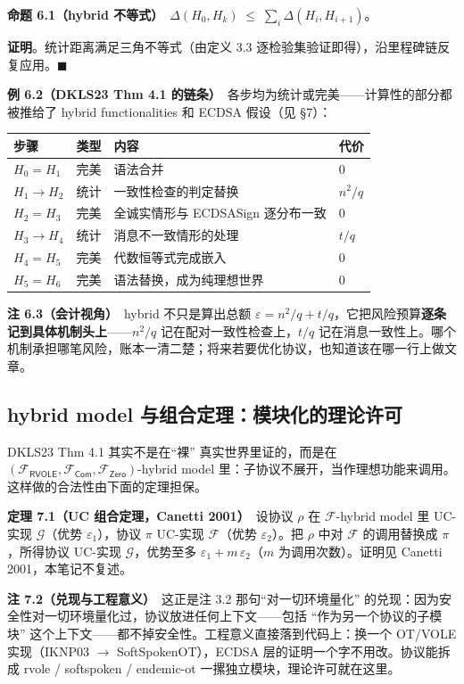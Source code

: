 \textbf{命题 6.1（hybrid
不等式）}　$\Delta(H_0, H_k) \;\le\; \sum_{i} \Delta(H_i, H_{i+1})$。

\textbf{证明}。统计距离满足三角不等式（由定义 3.3
逐检验集验证即得），沿里程碑链反复应用。$\blacksquare$

\textbf{例 6.2（DKLS23 Thm 4.1
的链条）}　各步均为统计或完美------计算性的部分都被推给了 hybrid
functionalities 和 ECDSA 假设（见 §7）：

\begin{longtable}[]{@{}llll@{}}
\toprule\noalign{}
步骤 & 类型 & 内容 & 代价 \\
\midrule\noalign{}
\endhead
\bottomrule\noalign{}
\endlastfoot
$H_0 = H_1$ & 完美 & 语法合并 & 0 \\
$H_1 \to H_2$ & 统计 & 一致性检查的判定替换 & $n^2/q$ \\
$H_2 = H_3$ & 完美 & 全诚实情形与 ECDSASign 逐分布一致 & 0 \\
$H_3 \to H_4$ & 统计 & 消息不一致情形的处理 & $t/q$ \\
$H_4 = H_5$ & 完美 & 代数恒等式完成嵌入 & 0 \\
$H_5 = H_6$ & 完美 & 语法替换，成为纯理想世界 & 0 \\
\end{longtable}

\textbf{注 6.3（会计视角）}　hybrid
不只是算出总额 $\varepsilon = n^2/q + t/q$，它把风险预算\textbf{逐条记到具体机制头上}------$n^2/q$ 记在配对一致性检查上，$t/q$ 记在消息一致性上。哪个机制承担哪笔风险，账本一清二楚；将来若要优化协议，也知道该在哪一行上做文章。

\subsection{hybrid model 与组合定理：模块化的理论许可}

DKLS23 Thm 4.1 其实不是在“裸”
真实世界里证的，而是在 $(\mathcal{F}_{\mathsf{RVOLE}}, \mathcal{F}_{\mathsf{Com}}, \mathcal{F}_{\mathsf{Zero}})$-hybrid
model
里：子协议不展开，当作理想功能来调用。这样做的合法性由下面的定理担保。

\textbf{定理 7.1（UC 组合定理，Canetti
2001）}　设协议 $\rho$ 在 $\mathcal{F}$-hybrid model 里
UC-实现 $\mathcal{G}$（优势 $\varepsilon_1$），协议 $\pi$ UC-实现 $\mathcal{F}$（优势 $\varepsilon_2$）。把 $\rho$ 中对 $\mathcal{F}$ 的调用替换成 $\pi$，所得协议
UC-实现 $\mathcal{G}$，优势至多 $\varepsilon_1 + m\,\varepsilon_2$（$m$ 为调用次数）。证明见
Canetti 2001，本笔记不复述。

\textbf{注 7.2（兑现与工程意义）}　这正是注 3.2 那句“对一切环境量化”
的兑现：因为安全性对一切环境量化过，协议放进任何上下文------包括
“作为另一个协议的子模块”
这个上下文------都不掉安全性。工程意义直接落到代码上：换一个 OT/VOLE
实现（IKNP03 $\rightarrow$ SoftSpokenOT），ECDSA
层的证明一个字不用改。协议能拆成 rvole / softspoken / endemic-ot
一摞独立模块，理论许可就在这里。

